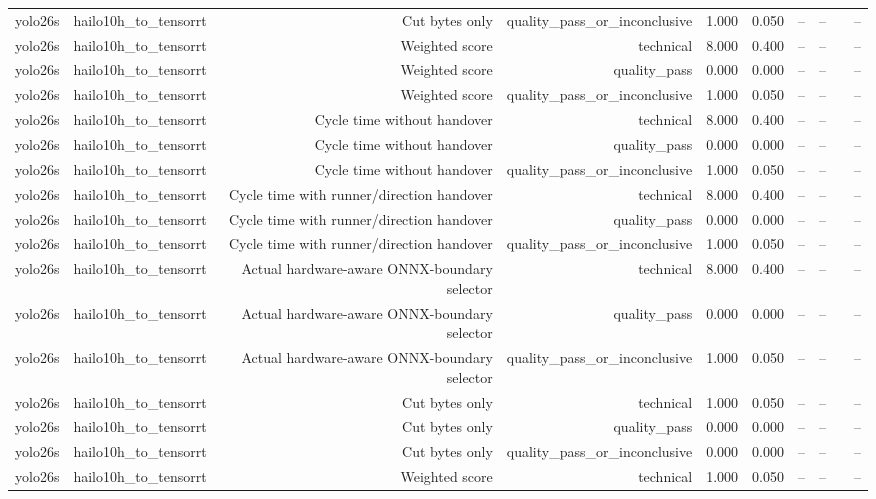 \begin{table}[t]
\begin{tabular}{lrrrrrrrrr}
yolo26s & hailo10h\_to\_tensorrt & Cut bytes only & quality\_pass\_or\_inconclusive & 1.000 & 0.050 & -- & -- &  & -- \\
yolo26s & hailo10h\_to\_tensorrt & Weighted score & technical & 8.000 & 0.400 & -- & -- &  & -- \\
yolo26s & hailo10h\_to\_tensorrt & Weighted score & quality\_pass & 0.000 & 0.000 & -- & -- &  & -- \\
yolo26s & hailo10h\_to\_tensorrt & Weighted score & quality\_pass\_or\_inconclusive & 1.000 & 0.050 & -- & -- &  & -- \\
yolo26s & hailo10h\_to\_tensorrt & Cycle time without handover & technical & 8.000 & 0.400 & -- & -- &  & -- \\
yolo26s & hailo10h\_to\_tensorrt & Cycle time without handover & quality\_pass & 0.000 & 0.000 & -- & -- &  & -- \\
yolo26s & hailo10h\_to\_tensorrt & Cycle time without handover & quality\_pass\_or\_inconclusive & 1.000 & 0.050 & -- & -- &  & -- \\
yolo26s & hailo10h\_to\_tensorrt & Cycle time with runner/direction handover & technical & 8.000 & 0.400 & -- & -- &  & -- \\
yolo26s & hailo10h\_to\_tensorrt & Cycle time with runner/direction handover & quality\_pass & 0.000 & 0.000 & -- & -- &  & -- \\
yolo26s & hailo10h\_to\_tensorrt & Cycle time with runner/direction handover & quality\_pass\_or\_inconclusive & 1.000 & 0.050 & -- & -- &  & -- \\
yolo26s & hailo10h\_to\_tensorrt & Actual hardware-aware ONNX-boundary selector & technical & 8.000 & 0.400 & -- & -- &  & -- \\
yolo26s & hailo10h\_to\_tensorrt & Actual hardware-aware ONNX-boundary selector & quality\_pass & 0.000 & 0.000 & -- & -- &  & -- \\
yolo26s & hailo10h\_to\_tensorrt & Actual hardware-aware ONNX-boundary selector & quality\_pass\_or\_inconclusive & 1.000 & 0.050 & -- & -- &  & -- \\
yolo26s & hailo10h\_to\_tensorrt & Cut bytes only & technical & 1.000 & 0.050 & -- & -- &  & -- \\
yolo26s & hailo10h\_to\_tensorrt & Cut bytes only & quality\_pass & 0.000 & 0.000 & -- & -- &  & -- \\
yolo26s & hailo10h\_to\_tensorrt & Cut bytes only & quality\_pass\_or\_inconclusive & 0.000 & 0.000 & -- & -- &  & -- \\
yolo26s & hailo10h\_to\_tensorrt & Weighted score & technical & 1.000 & 0.050 & -- & -- &  & -- \\

\end{tabular}
\end{table}
